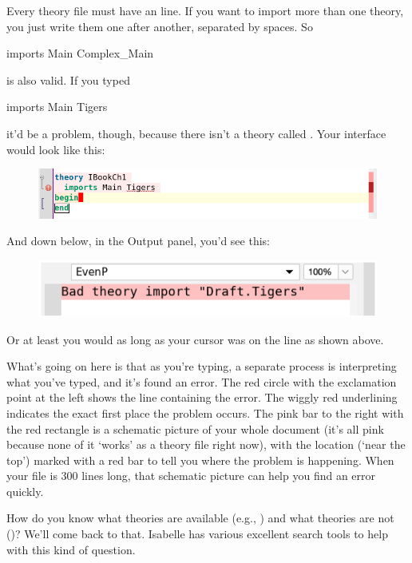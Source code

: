 Every theory file must have an  line. If you want to import more than one theory, you just write them one after another, separated by spaces. So 
\begin{IS}    
imports Main Complex_Main
\end{IS}
\noindent
is also valid. If you typed
\begin{IS}    
imports Main Tigers
\end{IS}    
\noindent
it'd be a problem, though, because there isn't a theory called . Your interface would look like this:
\begin{figure}[h]
    \centering
    \includegraphics[width=1\linewidth]{C01/Images/tigers.png}
\end{figure}
\newpage
And down below, in the Output panel, you'd see this:
\begin{figure}[h]
    \centering
    \includegraphics[width=0.75\linewidth]{C01/Images/tiger-error.png}
\end{figure}

Or at least you would as long as your cursor was on the  line as shown above. 

What's going on here is that as you're typing, a separate process is interpreting what you've typed, and it's found an error. The red circle with the exclamation point at the left shows the line containing the error. The wiggly red underlining indicates the exact first place the problem occurs. The pink bar to the right with the red rectangle is a schematic picture of your whole document (it's all pink because none of it `works' as a theory file right now), with the location (`near the top') marked with a red bar to tell you where the problem is happening. When your file is 300 lines long, that schematic picture can help you find an error quickly. 

How do you know what theories are available (e.g., ) and what theories are not ()? We'll come back to that. Isabelle has various excellent search tools to help with this kind of question. 

